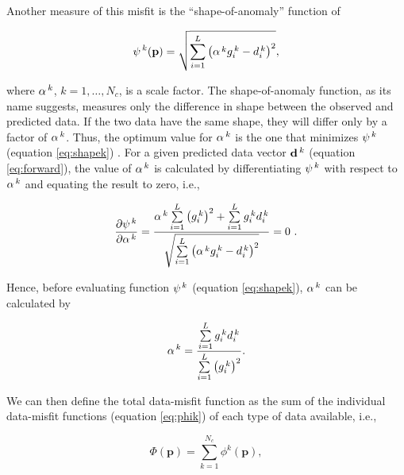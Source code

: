\documentclass[twocolumn,final]{svjour3}
\newcommand{\vect}[1]{\mathbf{#1}}
\begin{document}
\begin{sloppypar}
Another measure of this misfit is the ``shape-of-anomaly'' function of
\citet{rene}

\begin{equation}
    \psi^{\thinspace k}(\vect{p}) = \sqrt{
        \sum\limits_{i=1}^{L}
        \left(\alpha^{\thinspace k} g_{i}^{\thinspace k} - d_{i}^{\thinspace k}
        \right)^{2}
    },
    \label{eq:shapek}
\end{equation}

where $\alpha^{\thinspace k}$, $k=1,\ldots,N_{c}$, is a scale factor.
The shape-of-anomaly function, as its name suggests, measures only the
difference in shape between the observed and predicted data.
If the two data have the same shape, they will differ only by a factor of
$\alpha^{\thinspace k}$.
Thus, the optimum value for $\alpha^{\thinspace k}$ is the one that minimizes
$\psi^{\thinspace k}$ (equation \ref{eq:shapek}) \citep{rene}.
For a given predicted data vector $\vect{d}^{\thinspace k}$
(equation \ref{eq:forward}), the value of
$\alpha^{\thinspace k}$ is calculated by differentiating $\psi^{\thinspace k}$
with respect to $\alpha^{\thinspace k}$ and equating the result to zero,
i.e.,

\begin{equation}
    \dfrac{\partial \psi^{\thinspace k}}{\partial \alpha^{\thinspace k}} =
    \dfrac{\alpha^{\thinspace k}
        \sum\limits_{i=1}^{L}\left(g_{i}^{\thinspace k}\right)^{2} +
        \sum\limits_{i=1}^{L} g_{i}^{\thinspace k}d_{i}^{\thinspace k}}
        {\sqrt{\sum\limits_{i=1}^{L}
        \left(\alpha^{\thinspace k} g_{i}^{\thinspace k} - d_{i}^{\thinspace k}
        \right)^{2}}} = 0~.
\end{equation}

Hence, before evaluating function $\psi^{\thinspace k}$ (equation
\ref{eq:shapek}), $\alpha^{\thinspace k}$ can be calculated by \citep{rene}

\begin{equation}
    \alpha^{\thinspace k} = \dfrac{
        \sum\limits_{i=1}^{L} g_{i}^{\thinspace k} d_{i}^{\thinspace k}
    }{
        \sum\limits_{i=1}^{L}\left( g_{i}^{\thinspace k}\right)^{2}
    }.
    \label{eq:alpha}
\end{equation}

We can then define the total data-misfit function as the sum of the individual
data-misfit functions (equation \ref{eq:phik}) of each type of data available,
i.e.,

\begin{equation}
    \Phi(\vect{p}) = \sum\limits_{k=1}^{N_{c}} \phi^{k}(\vect{p}),
    \label{eq:phi}
\end{equation}


\end{sloppypar}
\end{document}
